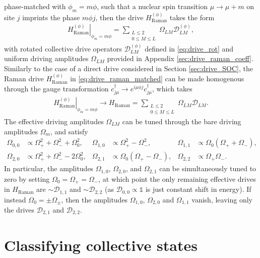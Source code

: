 \documentclass[nofootinbib,notitlepage,11pt]{revtex4-2}
\renewcommand{\t}{\text} %
\newcommand{\p}[1]{\left(#1\right)} %
\newcommand{\1}{\mathds{1}}
\newcommand{\D}{\mathcal{D}}
\begin{document}
phase-matched with $\phi_m=m\phi$, such that a nuclear spin transition
$\mu\to\mu+m$ on site $j$ imprints the phase $m\phi j$, then the drive
$H_{\t{Raman}}^{(\phi)}$ takes the form
\begin{align}
  \left. H_{\t{Raman}}^{(\phi)} \right|_{\phi_m=m\phi}
  = \sum_{\substack{L\le2\\0\le M\le L}} \Omega_{LM} \D_{LM}^{(\phi)},
  \label{eq:drive_raman_matched}
\end{align}
with rotated collective drive operators $\D_{LM}^{(\phi)}$ defined in
\eqref{eq:drive_rot} and uniform driving amplitudes $\Omega_{LM}$
provided in Appendix \ref{sec:drive_raman_coeff}.  Similarly to the
case of a direct drive considered in Section \ref{sec:drive_SOC}, the
Raman drive $H_{\t{Raman}}^{(\phi)}$ in \eqref{eq:drive_raman_matched}
can be made homogenous through the gauge transformation
$c_{j\mu}^\dag \to e^{i\mu\phi j} c_{j\mu}^\dag$, which takes
\begin{align}
  \left. H_{\t{Raman}}^{(\phi)} \right|_{\phi_m=m\phi}
  \to H_{\t{Raman}}
  = \sum_{\substack{L\le2\\0\le M\le L}} \Omega_{LM} \D_{LM}.
\end{align}
The effective driving amplitudes $\Omega_{LM}$ can be tuned through
the bare driving amplitudes $\Omega_m$, and satisfy
\begin{align}
  \Omega_{0,0} &\propto \Omega_+^2 + \Omega_-^2 + \Omega_0^2,
  &
  \Omega_{1,0} &\propto \Omega_+^2 - \Omega_-^2,
  &
  \Omega_{1,1} &\propto \Omega_0 \p{\Omega_+ + \Omega_-}, \\
  \Omega_{2,0} &\propto \Omega_+^2 + \Omega_-^2 - 2\Omega_0^2,
  &
  \Omega_{2,1} &\propto \Omega_0 \p{\Omega_+ - \Omega_-},
  &
  \Omega_{2,2} &\propto \Omega_+ \Omega_-.
\end{align}
In particular, the amplitudes $\Omega_{1,0}$, $\Omega_{2,0}$, and
$\Omega_{2,1}$ can be simultaneously tuned to zero by setting
$\Omega_0=\Omega_+=\Omega_-$, at which point the only remaining
effective drives in $H_{\t{Raman}}$ are $\sim\D_{1,1}$ and
$\sim\D_{2,2}$ (as $\D_{0,0}\propto\1$ is just constant shift in
energy).  If instead $\Omega_0=\pm\Omega_\pm$, then the amplitudes
$\Omega_{1,0}$, $\Omega_{2,0}$ and $\Omega_{1,1}$ vanish, leaving only
the drives $\D_{2,1}$ and $\D_{2,2}$.

\section{Classifying collective states}
\end{document}
